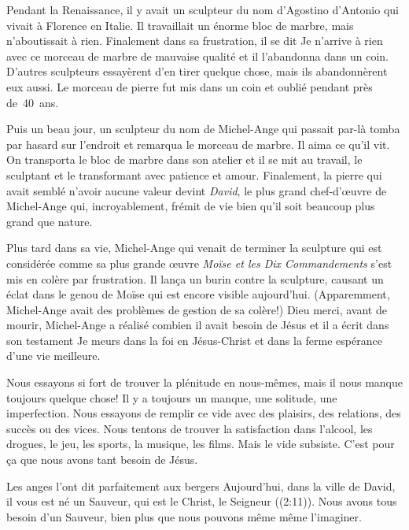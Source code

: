 

Pendant la Renaissance, il y avait un sculpteur du nom d'Agostino d'Antonio qui vivait à Florence en Italie. Il travaillait un énorme bloc de marbre, mais n'aboutissait à rien. Finalement dans sa frustration, il se dit\frcolon{}
\Og Je n'arrive à rien avec ce morceau de marbre de mauvaise qualit\'e \Fg{}
et il l'abandonna dans un coin. D'autres sculpteurs essayèrent d'en tirer quelque chose, mais ils abandonnèrent eux aussi. Le morceau de pierre fut mis dans un coin et oublié pendant près de~40~ans.

Puis un beau jour, un sculpteur du nom de Michel-Ange qui passait par-là tomba par hasard sur l'endroit et remarqua le morceau de marbre. Il aima ce qu'il vit. On transporta le bloc de marbre dans son atelier et il se mit au travail, le sculptant et le transformant avec patience et amour. Finalement, la pierre qui avait semblé n'avoir aucune valeur devint \emph{David}, le plus grand chef-d'œuvre de Michel-Ange qui, incroyablement, frémit de vie bien qu'il soit beaucoup plus grand que nature.

Plus tard dans sa vie, Michel-Ange qui venait de terminer la sculpture qui est considérée comme sa plus grande œuvre \ocadr \emph{Moïse et les Dix Commandements} \fcadr{} s'est mis en colère par frustration. Il lança un burin contre la sculpture, causant un éclat dans le genou de Moïse qui est encore visible aujourd'hui. (Apparemment, Michel-Ange avait des problèmes de \Og gestion \Fg{} de sa colère!) Dieu merci, avant de mourir, Michel-Ange a réalisé combien il avait besoin de Jésus et il a écrit dans son testament\frcolon{}
\Og Je meurs dans la foi en Jésus-Christ et dans la ferme espérance d'une vie meilleure. \Fg{}

Nous essayons si fort de trouver la plénitude en nous-mêmes, mais il nous manque toujours quelque chose! Il y a toujours un manque, une solitude, une imperfection. Nous essayons de remplir ce vide avec des plaisirs, des relations, des succès ou des vices. Nous tentons de trouver la satisfaction dans l'alcool, les drogues, le jeu, les sports, la musique, les films. Mais le vide subsiste. C'est pour ça que nous avons tant besoin de Jésus.

Les anges l'ont dit parfaitement aux bergers\frcolon{}
\Og Aujourd'hui, dans la ville de David, il vous est né un Sauveur, qui est le Christ, le Seigneur\Fg{} ((2:11)). Nous avons tous besoin d'un Sauveur, bien plus que nous pouvons même même l'imaginer.

\begin{dvquotes}
\end{dvquotes}

